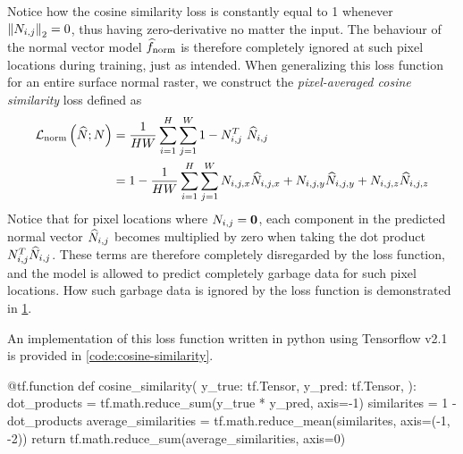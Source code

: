 %
Notice how the cosine similarity loss is constantly equal to 1 whenever $\left\lVert N_{i,j}\right\rVert_2 = 0$, thus having zero-derivative no matter the input.
The behaviour of the normal vector model $\widehat{f}_{\mathrm{norm}}$ is therefore completely ignored at such pixel locations during training, just as intended.
When generalizing this loss function for an entire surface normal raster, we construct the \textit{pixel-averaged cosine similarity} loss defined as
%
\begin{gather}\begin{aligned}
  \mathcal{L}_{\mathrm{norm}}\left(
    \widehat{N}; N
  \right)
  &=
  \frac{1}{HW}
  \sum_{i = 1}^{H}
  \sum_{j = 1}^{W}
  1 - N_{i,j}^T~\widehat{N}_{i,j}
  \\
  &=
  1 -
  \frac{1}{HW}
  \sum_{i = 1}^{H}
  \sum_{j = 1}^{W}
    N_{i,j,x} \widehat{N}_{i,j,x}
  + N_{i,j,y} \widehat{N}_{i,j,y}
  + N_{i,j,z} \widehat{N}_{i,j,z}
  \label{eq:cosine-loss}
\end{aligned}\end{gather}
%
Notice that for pixel locations where $N_{i,j} = \boldsymbol{0}$, each component in the predicted normal vector $\widehat{N}_{i,j}$ becomes multiplied by zero when taking the dot product $N_{i,j}^T \widehat{N}_{i,j}$.
These terms are therefore completely disregarded by the loss function, and the model is allowed to predict completely garbage data for such pixel locations.
How such garbage data is ignored by the loss function is demonstrated in \cref{fig:cosine-similarity-example}.
%
\begin{figure}[H]
  \centering
  \label{fig:cosine-similarity-example}
\end{figure}
\noindent
An implementation of this loss function written in python using Tensorflow v2.1 is provided in \cref{code:cosine-similarity}.
%
\begin{listing}[H]
  \caption{%
    Cosine similarity loss function implemented in Tensorflow v2.1.
  }%
  \label{code:cosine-similarity}
  \begin{pythoncode}
  @tf.function
  def cosine_similarity(
      y_true: tf.Tensor,
      y_pred: tf.Tensor,
  ):
      dot_products = tf.math.reduce_sum(y_true * y_pred, axis=-1)
      similarites = 1 - dot_products
      average_similarities = tf.math.reduce_mean(similarites, axis=(-1, -2))
      return tf.math.reduce_sum(average_similarities, axis=0)
  \end{pythoncode}
\end{listing}

